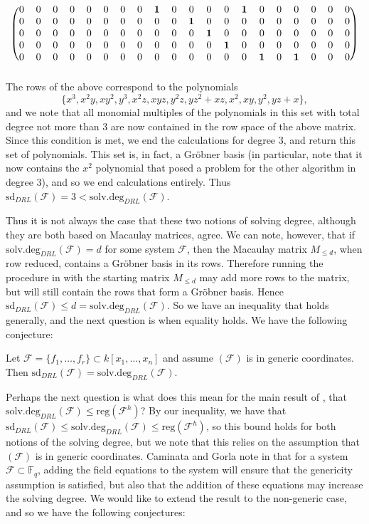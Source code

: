 \documentclass[11pt]{article}
\newenvironment{conjecture}[2][Conjecture]{\begin{trivlist}
\item[\hskip \labelsep {\bfseries #1}\hskip \labelsep {\bfseries #2.}]}{\end{trivlist}}
\newcommand{\F}{\mathcal{F}}
\newcommand{\sdeg}{\text{solv.deg}}
\newcommand{\sd}{\text{sd}}
\newcommand{\reg}{\text{reg}}
\begin{document}
\[\begin{blockarray}{cccccccccccccccccccc}
\begin{block}{(cccccccccccccccccccc)}
		0 & 0 & 0 & 0 & 0 & 0 & 0 & 0 & \mathbf{1} & 0 & 0 & 0 & 0 & \mathbf{1} & 0 & 0 & 0 & 0 & 0 & 0 \\
		0 & 0 & 0 & 0 & 0 & 0 & 0 & 0 & 0 & 0 & \mathbf{1} & 0 & 0 & 0 & 0 & 0 & 0 & 0 & 0 & 0 \\
		0 & 0 & 0 & 0 & 0 & 0 & 0 & 0 & 0 & 0 & 0 & \mathbf{1} & 0 & 0 & 0 & 0 & 0 & 0 & 0 & 0 \\
		0 & 0 & 0 & 0 & 0 & 0 & 0 & 0 & 0 & 0 & 0 & 0 & \mathbf{1} & 0 & 0 & 0 & 0 & 0 & 0 & 0 \\
		0 & 0 & 0 & 0 & 0 & 0 & 0 & 0 & 0 & 0 & 0 & 0 & 0 & 0 & \mathbf{1} & 0 & \mathbf{1} & 0 & 0 & 0 \\
	\end{block}
\end{blockarray} \] The rows of the above correspond to the polynomials \[ \{x^3, x^2y, xy^2, y^3, x^2z, xyz, y^2z, yz^2 + xz, x^2, xy, y^2, yz + x\}, \] and we note that all monomial multiples of the polynomials in this set with total degree not more than 3 are now contained in the row space of the above matrix. Since this condition is met, we end the calculations for degree 3, and return this set of polynomials. This set is, in fact, a Gröbner basis (in particular, note that it now contains the $x^2$ polynomial that posed a problem for the other algorithm in degree 3), and so we end calculations entirely. Thus $\sd_{DRL}(\F) = 3 < \sdeg_{DRL}(\F)$. 

Thus it is not always the case that these two notions of solving degree, although they are both based on Macaulay matrices, agree. We can note, however, that if $\sdeg_{DRL}(\F) = d$ for some system $\F$, then the Macaulay matrix $M_{\leq d}$, when row reduced, contains a Gröbner basis in its rows. Therefore running the procedure in \cite{caminata2023solving} with the starting matrix $M_{\leq d}$ may add more rows to the matrix, but will still contain the rows that form a Gröbner basis. Hence $\sd_{DRL}(\F) \leq d = \sdeg_{DRL}(\F)$. So we have an inequality that holds generally, and the next question is when equality holds. We have the following conjecture:

\begin{conjecture}{1}
	Let $\F = \{f_1, \dots, f_r\} \subset k[x_1, \dots, x_n]$ and assume $(\F)$ is in generic coordinates. Then $\sd_{DRL}(\F) = \sdeg_{DRL}(\F)$.
\end{conjecture}

Perhaps the next question is what does this mean for the main result of \cite{caminata2020solving}, that $\sdeg_{DRL}(\F) \leq \reg(\F^h)$? By our inequality, we have that $\sd_{DRL}(\F) \leq \sdeg_{DRL}(\F) \leq \reg(\F^h)$, so this bound holds for both notions of the solving degree, but we note that this relies on the assumption that $(\F)$ is in generic coordinates. Caminata and Gorla note in \cite{caminata2020solving} that for a system $\F \subset \mathbb{F}_q$, adding the field equations to the system will ensure that the genericity assumption is satisfied, but also that the addition of these equations may increase the solving degree. We would like to extend the result to the non-generic case, and so we have the following conjectures:
\end{document}
